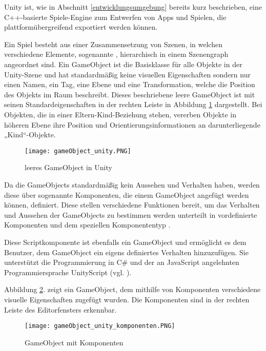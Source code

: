 Unity ist, wie in Abschnitt \ref{entwicklungsumgebung} bereits kurz beschrieben, eine C++-basierte Spiele-Engine zum Entwerfen von Apps und Spielen, die plattformübergreifend exportiert werden können.

Ein Spiel besteht aus einer Zusammensetzung von Szenen, in welchen verschiedene Elemente, sogenannte , hierarchisch in einem Szenengraph angeordnet sind. 
Ein GameObject ist die Basisklasse für alle Objekte in der Unity-Szene und hat standardmäßig keine visuellen Eigenschaften sondern nur einen Namen, ein Tag, eine Ebene und eine Transformation, welche die Position des Objekts im Raum beschreibt.
Dieses beschriebene leere GameObject ist mit seinen Standardeigenschaften in der rechten Leiste in Abbildung \ref{fig:gameObject_unity} dargestellt.
Bei Objekten, die in einer Eltern-Kind-Beziehung stehen, vererben Objekte in höheren Ebene ihre Position und Orientierungsinformationen an darunterliegende „Kind“-Objekte.

\begin{figure} [h]
\centering
\texttt{[image: gameObject\_unity.PNG]}
\caption{leeres GameObject in Unity \cite{Tuplier2014}}
\label{fig:gameObject_unity}
\end{figure}

Da die GameObjects standardmäßig kein Aussehen und Verhalten haben, werden diese über sogenannte Komponenten, die einem GameObject angefügt werden können, definiert.
Diese stellen verschiedene Funktionen bereit, um das Verhalten und Aussehen der GameObjects zu bestimmen werden unterteilt in vordefinierte Komponenten und dem speziellen Komponententyp .

Diese Scriptkomponente ist ebenfalls ein GameObject und ermöglicht es dem Benutzer, dem GameObject ein eigens definiertes Verhalten hinzuzufügen. 
Sie unterstützt die Programmierung in C\# und der an JavaScript angelehnten Programmiersprache UnityScript (vgl. \cite{Geiger2014}).

Abbildung \ref{fig:gameObject_unity_komponenten}. zeigt ein GameObject, dem mithilfe von Komponenten verschiedene visuelle Eigenschaften zugefügt wurden. Die Komponenten sind in der rechten Leiste des Editorfensters erkennbar.

\begin{figure} [h]
\centering
\texttt{[image: gameObject\_unity\_komponenten.PNG]}
\caption{GameObject mit Komponenten \cite{Tuplier2014}}
\label{fig:gameObject_unity_komponenten}
\end{figure}

